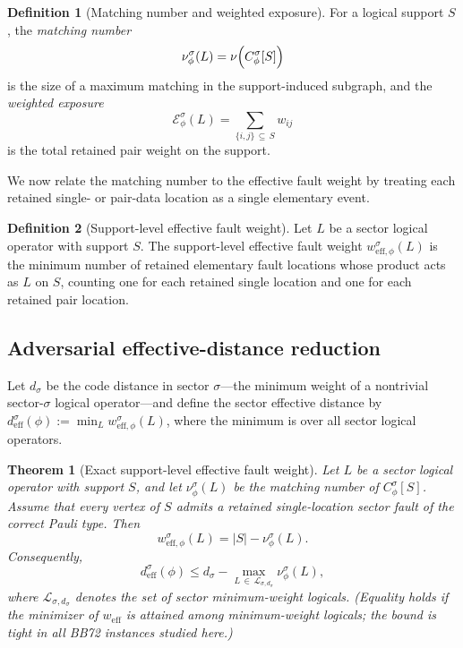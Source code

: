 \documentclass[
aps,
prx,
10pt,
twocolumn,
groupedaddress,
longbibliography,
nofootinbib,
floatfix
]{revtex4-2}
\newtheorem{theorem}{Theorem}
\theoremstyle{definition}
\newtheorem{definition}{Definition}
\newcommand{\Ew}{\mathcal{E}}
\begin{document}
\begin{definition}[Matching number and weighted exposure]
For a logical support $S$, the \emph{matching number}
\begin{equation}
\nu_{\phi}^{\sigma}(L)=\nu\Bigl(C_{\phi}^{\sigma}[S]\Bigr)
\end{equation}
is the size of a maximum matching in the support-induced subgraph, and the \emph{weighted exposure}
\begin{equation}
\Ew_{\phi}^{\sigma}(L)=\sum_{\{i,j\}\,\subseteq\, S} w_{ij}
\label{eq:exposure-def}
\end{equation}
is the total retained pair weight on the support.
\end{definition}

We now relate the matching number to the effective fault weight by treating each retained single- or pair-data location as a single elementary event.

\begin{definition}[Support-level effective fault weight]
Let $L$ be a sector logical operator with support $S$. The support-level effective fault weight $w^{\sigma}_{\mathrm{eff},\phi}(L)$ is the minimum number of retained elementary fault locations whose product acts as $L$ on $S$, counting one for each retained single location and one for each retained pair location.
\end{definition}

\subsection{Adversarial effective-distance reduction}

Let $d_{\sigma}$ be the code distance in sector $\sigma$---the minimum weight of a nontrivial sector-$\sigma$ logical operator---and define the sector effective distance by $d^{\sigma}_{\mathrm{eff}}(\phi):=\min_L w^{\sigma}_{\mathrm{eff},\phi}(L)$, where the minimum is over all sector logical operators.

\begin{theorem}[Exact support-level effective fault weight]
\label{thm:deff}
Let $L$ be a sector logical operator with support $S$, and let $\nu_{\phi}^{\sigma}(L)$ be the matching number of $C_{\phi}^{\sigma}[S]$. Assume that every vertex of $S$ admits a retained single-location sector fault of the correct Pauli type. Then
\begin{equation}
w^{\sigma}_{\mathrm{eff},\phi}(L)= |S|-\nu_{\phi}^{\sigma}(L).
\label{eq:weff-bound}
\end{equation}
Consequently,
\begin{equation}
d^{\sigma}_{\mathrm{eff}}(\phi)\le d_{\sigma}-\max_{L\,\in\,\mathcal L_{\sigma,d_{\sigma}}}\nu_{\phi}^{\sigma}(L),
\label{eq:deff-bound}
\end{equation}
where $\mathcal L_{\sigma,d_{\sigma}}$ denotes the set of sector minimum-weight logicals. (Equality holds if the minimizer of $w_{\mathrm{eff}}$ is attained among minimum-weight logicals; the bound is tight in all BB72 instances studied here.)
\end{theorem}
\end{document}
